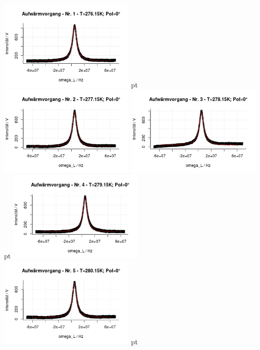 \documentclass[12pt]{article}
\begin{document}
\begin{minipage}[h!]{\textwidth}
	\centering
	\includegraphics[width=0.49\textwidth]{figures/warm0-1.png} pt
	\includegraphics[width=0.49\textwidth]{figures/warm0-2.png}\vskip -10pt
	\includegraphics[width=0.49\textwidth]{figures/warm0-3.png} pt
	\includegraphics[width=0.49\textwidth]{figures/warm0-4.png}\vskip -10pt
	\includegraphics[width=0.49\textwidth]{figures/warm0-5.png} pt

\end{minipage}
\end{document}

